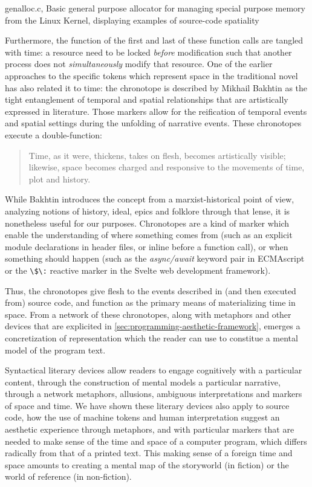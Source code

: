\begin{listing}
    \inputminted[]{c}{./corpus/genalloc.c}
    \caption{genalloc.c, Basic general purpose allocator for managing special purpose memory from the Linux Kernel, displaying examples of source-code spatiality \citep{linux_content_2023}}
    \label{code:genalloc}
\end{listing}

Furthermore, the function of the first and last of these function calls are tangled with time: a resource need to be locked \emph{before} modification such that another process does not \emph{simultaneously} modify that resource. One of the earlier approaches to the specific tokens which represent space in the traditional novel has also related it to time: the chronotope is described by Mikhail Bakhtin as the tight entanglement of temporal and spatial relationships that are artistically expressed in literature. Those markers allow for the reification of temporal events and spatial settings during the unfolding of narrative events. These chronotopes execute a double-function:

\begin{quote}
    Time, as it were, thickens, takes on flesh, becomes artistically visible; likewise, space becomes charged and responsive to the movements of time, plot and history. \citep{bakhtin_dialogic_1981}
\end{quote}

While Bakhtin introduces the concept from a marxist-historical point of view, analyzing notions of history, ideal, epics and folklore through that lense, it is nonetheless useful for our purposes. Chronotopes are a kind of marker which enable the understanding of where something comes from (such as an explicit module declarations in header files, or inline before a function call), or when something should happen (such as the \emph{async/await} keyword pair in ECMAscript or the \lstinline{\$\:} reactive marker in the Svelte web development framework).

Thus, the chronotopes give flesh to the events described in (and then executed from) source code, and function as the primary means of materializing time in space. From a network of these chronotopes, along with metaphors and other devices that are explicited in \ref{sec:programming-aesthetic-framework}, emerges a concretization of representation which the reader can use to constitue a mental model of the program text.

\spacer

Syntactical literary devices allow readers to engage cognitively with a particular content, through the construction of mental models a particular narrative, through a network metaphors, allusions, ambiguous interpretations and markers of space and time. We have shown these literary devices also apply to source code, how the use of machine tokens and human interpretation suggest an aesthetic experience through metaphors, and with particular markers that are needed to make sense of the time and space of a computer program, which differs radically from that of a printed text. This making sense of a foreign time and space amounts to creating a mental map of the storyworld (in fiction) or the world of reference (in non-fiction).

